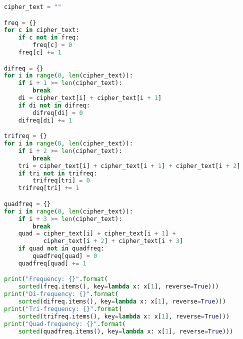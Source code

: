 \documentclass{article}
\begin{document}
    \begin{lstlisting}[language=Python]
cipher_text = ""

freq = {}
for c in cipher_text:
    if c not in freq:
        freq[c] = 0
    freq[c] += 1

difreq = {}
for i in range(0, len(cipher_text)):
    if i + 1 >= len(cipher_text):
        break
    di = cipher_text[i] + cipher_text[i + 1]
    if di not in difreq:
        difreq[di] = 0
    difreq[di] += 1

trifreq = {}
for i in range(0, len(cipher_text)):
    if i + 2 >= len(cipher_text):
        break
    tri = cipher_text[i] + cipher_text[i + 1] + cipher_text[i + 2]
    if tri not in trifreq:
        trifreq[tri] = 0
    trifreq[tri] += 1

quadfreq = {}
for i in range(0, len(cipher_text)):
    if i + 3 >= len(cipher_text):
        break
    quad = cipher_text[i] + cipher_text[i + 1] + 
           cipher_text[i + 2] + cipher_text[i + 3]
    if quad not in quadfreq:
        quadfreq[quad] = 0
    quadfreq[quad] += 1

print("Frequency: {}".format(
    sorted(freq.items(), key=lambda x: x[1], reverse=True)))
print("Di-frequency: {}".format(
    sorted(difreq.items(), key=lambda x: x[1], reverse=True)))
print("Tri-frequency: {}".format(
    sorted(trifreq.items(), key=lambda x: x[1], reverse=True)))
print("Quad-frequency: {}".format(
    sorted(quadfreq.items(), key=lambda x: x[1], reverse=True)))
    \end{lstlisting}
\end{document}
